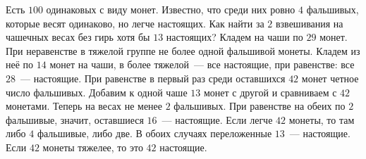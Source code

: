 \problem
Есть $100$ одинаковых с виду монет.
Известно, что среди них ровно $4$ фальшивых, которые весят одинаково, но легче
настоящих.
Как найти за $2$ взвешивания на чашечных весах без гирь хотя бы $13$ настоящих?
\solution
Кладем на чаши по $29$ монет.
При неравенстве в тяжелой группе не более одной фальшивой монеты.
Кладем из неё по $14$ монет на чаши, в более тяжелой~--- все настоящие, при
равенстве: все $28$~--- настоящие.
При равенстве в первый раз среди оставшихся $42$ монет четное число фальшивых.
Добавим к одной чаше $13$ монет с другой и сравниваем с $42$ монетами.
Теперь на весах не менее $2$ фальшивых.
При равенстве на обеих по $2$ фальшивые, значит, оставшиеся $16$~--- настоящие.
Если легче $42$ монеты, то там либо $4$ фальшивые, либо две.
В обоих случаях переложенные $13$~--- настоящие.
Если $42$ монеты тяжелее, то это $42$ настоящие.
\endproblem
